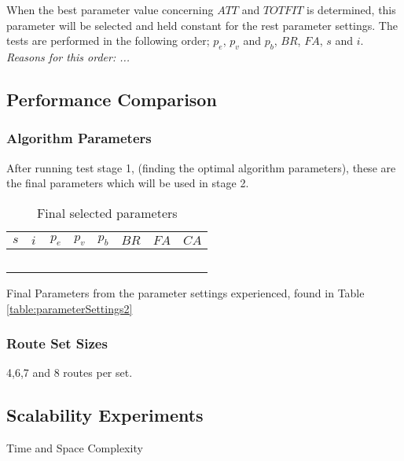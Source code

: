 When the best parameter value concerning $ATT$ and $TOTFIT$ is determined, this parameter will be selected and held constant for the rest parameter settings. The tests are performed in the following order; $p_{e}$, $p_{v}$ and $p_{b}$, $BR$, $FA$, $s$ and $i$. \emph{\color{red} Reasons for this order: ... }

\subsection{Performance Comparison}

\subsubsection{Algorithm Parameters}
After running test stage 1, (finding the optimal algorithm parameters), these are the final parameters which will be used in stage 2.

\begin{table}[H]
	\centering
    \begin{tabular}{|l|l|l|l|l|l|l|l|}
 	\hline
 	$s$ & $i$ & $p_{e}$ & $p_{v}$ & $p_{b}$ & $BR$ & $FA$ & $CA$  \\
 	\hline
    ~ & ~ & ~ & ~ & ~ & ~ & ~ & ~  \\
	\hline
    \end{tabular}
    \caption {Final selected parameters}
    Final Parameters from the parameter settings experienced, found in Table \ref{table:parameterSettings2}
    \label{table:finalParameters}
	\end{table}

\subsubsection{Route Set Sizes}
4,6,7 and 8 routes per set.

\subsection{Scalability Experiments}
Time and Space Complexity
